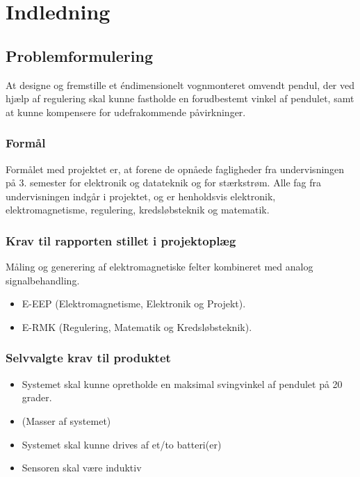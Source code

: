 \chapter{Indledning}

\section{Problemformulering}
At designe og fremstille et éndimensionelt vognmonteret omvendt pendul, der ved hjælp af regulering skal kunne fastholde en forudbestemt vinkel af pendulet, samt at kunne kompensere for udefrakommende påvirkninger. 

\subsection{Formål}
Formålet med projektet er, at forene de opnåede fagligheder fra undervisningen på 3. semester for elektronik og datateknik og for stærkstrøm. Alle fag fra undervisningen indgår i projektet, og er henholdsvis elektronik, elektromagnetisme, regulering, kredsløbsteknik og matematik.

\subsection{Krav til rapporten stillet i projektoplæg}
Måling og generering af elektromagnetiske felter kombineret med analog signalbehandling.
\begin{itemize}
\item E-EEP (Elektromagnetisme, Elektronik og Projekt).
\item E-RMK (Regulering, Matematik og Kredsløbsteknik).
\end{itemize}

\subsection{Selvvalgte krav til produktet} \label{afs:kravspecifikation}
\begin{itemize}
\item Systemet skal kunne opretholde en maksimal svingvinkel af pendulet på 20 grader.
\item (Masser af systemet)
\item Systemet skal kunne drives af et/to batteri(er)
\item Sensoren skal være induktiv
\end{itemize}

